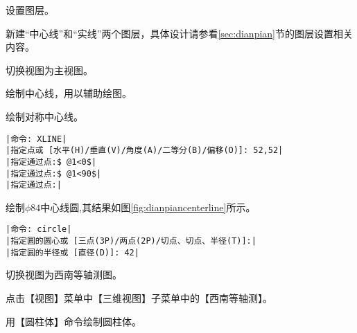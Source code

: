 
\begin{procedure}
\item 设置图层。

新建“中心线”和“实线”两个图层，具体设计请参看\ref{sec:dianpian}节的图层设置相关内容。
\item 切换视图为主视图。

\item 绘制中心线，用以辅助绘图。

绘制对称中心线。
\begin{lstlisting}
|命令: XLINE|
|指定点或 [水平(H)/垂直(V)/角度(A)/二等分(B)/偏移(O)]: 52,52|
|指定通过点:$ @1<0$|
|指定通过点:$ @1<90$|
|指定通过点:|
\end{lstlisting}
绘制$\phi 84$中心线圆,其结果如图\ref{fig:dianpiancenterline}所示。
\begin{lstlisting}
|命令: circle|
|指定圆的圆心或 [三点(3P)/两点(2P)/切点、切点、半径(T)]:|
|指定圆的半径或 [直径(D)]: 42|
\end{lstlisting}
\begin{figure}[htbp]
\centering
\begin{floatrow}
\end{floatrow}
\end{figure}
\item 切换视图为西南等轴测图。

点击【视图】菜单中【三维视图】子菜单中的【西南等轴测】。
\item 用【圆柱体】命令绘制圆柱体。


\end{procedure}
